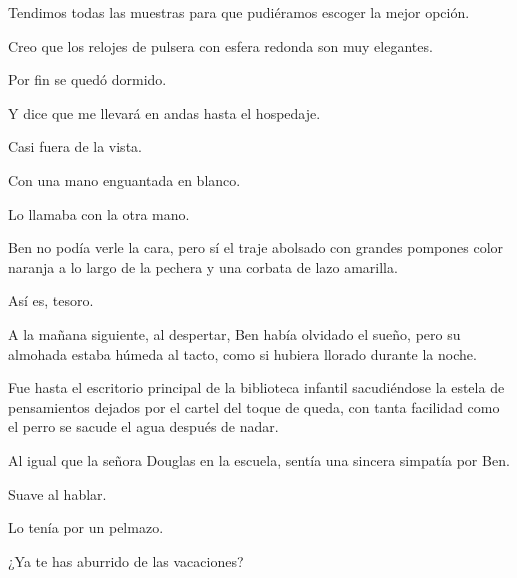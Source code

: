 \sk
Tendimos todas las muestras para que pudiéramos escoger la mejor opción. 

\sk
Creo que los relojes de pulsera con esfera redonda son muy elegantes. 

\sk
Por fin se quedó dormido. 

\sk
Y dice que me llevará en andas hasta el hospedaje.

\sk
Casi fuera de la vista. 

\sk
Con una mano enguantada en blanco. 

\sk
Lo llamaba con la otra mano. 

\sk
Ben no podía verle la cara,
pero sí el traje abolsado con grandes pompones
color naranja a lo largo de la pechera y una corbata
de lazo amarilla.

\sk
Así es, tesoro. 

\sk
A la mañana siguiente, al despertar, Ben había
olvidado el sueño, pero su almohada estaba
húmeda al tacto, como si hubiera llorado durante la
noche.

\sk
Fue hasta el escritorio principal de la biblioteca
infantil sacudiéndose la estela de pensamientos
dejados por el cartel del toque de queda, con tanta
facilidad como el perro se sacude el agua después
de nadar.

\sk
Al igual que la señora Douglas en la escuela, sentía
una sincera simpatía por Ben.

\sk
Suave al hablar. 

\sk
Lo tenía por un pelmazo. 

\sk
¿Ya te has aburrido de las vacaciones?

